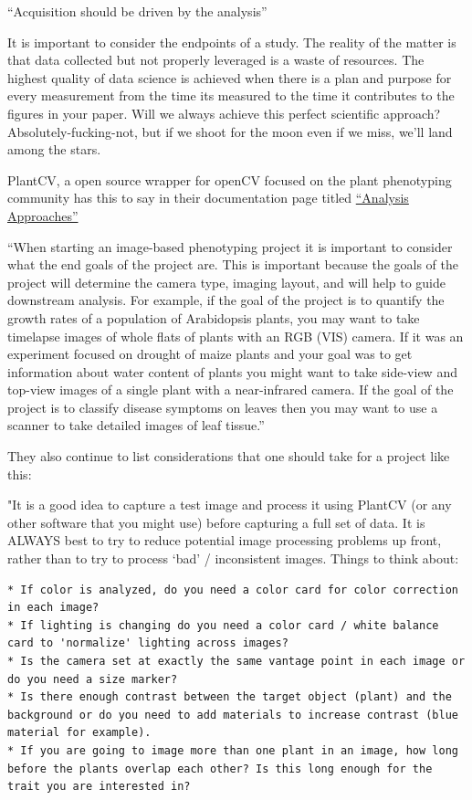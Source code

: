 \documentclass[11pt]{article}
\begin{document}
``Acquisition should be driven by the analysis''

It is important to consider the endpoints of a study. The reality of the
matter is that data collected but not properly leveraged is a waste of
resources. The highest quality of data science is achieved when there is
a plan and purpose for every measurement from the time its measured to
the time it contributes to the figures in your paper. Will we always
achieve this perfect scientific approach? Absolutely-fucking-not, but if
we shoot for the moon even if we miss, we'll land among the stars.

PlantCV, a open source wrapper for openCV focused on the plant
phenotyping community has this to say in their documentation page titled
\href{https://plantcv.readthedocs.io/en/latest/analysis_approach/}{``Analysis
Approaches''}

``When starting an image-based phenotyping project it is important to
consider what the end goals of the project are. This is important
because the goals of the project will determine the camera type, imaging
layout, and will help to guide downstream analysis. For example, if the
goal of the project is to quantify the growth rates of a population of
Arabidopsis plants, you may want to take timelapse images of whole flats
of plants with an RGB (VIS) camera. If it was an experiment focused on
drought of maize plants and your goal was to get information about water
content of plants you might want to take side-view and top-view images
of a single plant with a near-infrared camera. If the goal of the
project is to classify disease symptoms on leaves then you may want to
use a scanner to take detailed images of leaf tissue.''

They also continue to list considerations that one should take for a
project like this:

"It is a good idea to capture a test image and process it using PlantCV
(or any other software that you might use) before capturing a full set
of data. It is ALWAYS best to try to reduce potential image processing
problems up front, rather than to try to process `bad' / inconsistent
images. Things to think about:

\begin{verbatim}
* If color is analyzed, do you need a color card for color correction in each image?
* If lighting is changing do you need a color card / white balance card to 'normalize' lighting across images?
* Is the camera set at exactly the same vantage point in each image or do you need a size marker?
* Is there enough contrast between the target object (plant) and the background or do you need to add materials to increase contrast (blue material for example).
* If you are going to image more than one plant in an image, how long before the plants overlap each other? Is this long enough for the trait you are interested in?
\end{verbatim}
\end{document}
